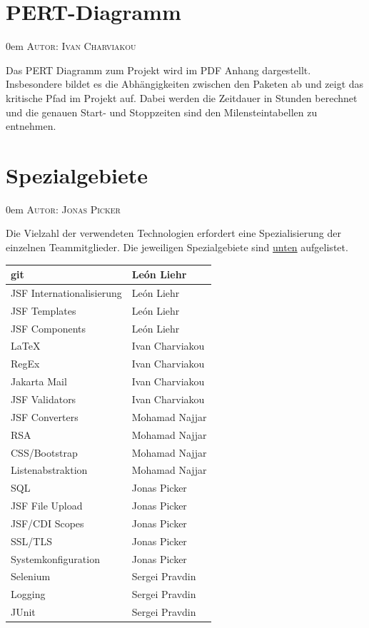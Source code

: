 \documentclass{article}
\makeatletter
\newcommand{\sectionauthor}[1]{
	{\parindent 0em \large \scshape Autor: #1 \par \nobreak \vspace*{1em}}
	\@afterheading
}
\makeatother
\begin{document}
\section{PERT-Diagramm}
\sectionauthor{Ivan Charviakou}

Das PERT Diagramm zum Projekt wird im PDF Anhang dargestellt. 
Insbesondere bildet es die Abhängigkeiten zwischen den Paketen ab und zeigt das kritische Pfad im Projekt auf. 
Dabei werden die Zeitdauer in Stunden berechnet und die genauen Start- und Stoppzeiten sind den Milensteintabellen zu entnehmen.


\section{Spezialgebiete}
\sectionauthor{Jonas Picker}
Die Vielzahl der verwendeten Technologien erfordert eine Spezialisierung der einzelnen Teammitglieder. Die jeweiligen Spezialgebiete sind \hyperlink{speziell}{unten} aufgelistet.
\begin{table}[H]
\centering
\hypertarget{speziell}{}
\begin{tabular}{| p{6cm} | p{6cm} |}
	\hline
     	git & León Liehr \\
     	\hline
     	JSF Internationalisierung & León Liehr \\
     	\hline
    	JSF Templates & León Liehr \\
     	\hline
     	JSF Components & León Liehr \\
     	\hline
     	\hline
     	LaTeX & Ivan Charviakou \\
     	\hline
     	RegEx & Ivan Charviakou \\
     	\hline
     	Jakarta Mail & Ivan Charviakou \\
     	\hline
     	JSF Validators & Ivan Charviakou \\
     	\hline
     	\hline
     	JSF Converters & Mohamad Najjar \\
    	\hline
    	 RSA & Mohamad Najjar \\
    	\hline
    	 CSS/Bootstrap & Mohamad Najjar \\
     	\hline
     	Listenabstraktion & Mohamad Najjar \\
     	\hline
     	\hline
     	SQL & Jonas Picker \\
    	\hline
    	JSF File Upload & Jonas Picker \\
     	\hline
     	JSF/CDI Scopes & Jonas Picker \\
     	\hline
     	SSL/TLS & Jonas Picker \\
     	\hline
     	Systemkonfiguration & Jonas Picker \\
     	\hline
     	\hline
     	Selenium & Sergei Pravdin \\
     	\hline
     	Logging & Sergei Pravdin \\
     	\hline
     	JUnit & Sergei Pravdin \\
     	\hline
\end{tabular}
\end{table}
\newpage
\end{document}
